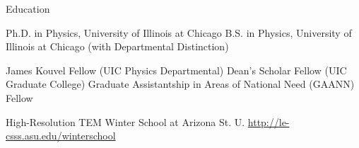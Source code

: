 \begin{rubric}{Education}


  \entry*[2005 --- 2013] Ph.D. in Physics, University of Illinois at Chicago
  \entry*[2002 --- 2005] B.S. in Physics, University of Illinois at Chicago (with Departmental Distinction)
  

  \entry*[2011 --- 2012] James Kouvel Fellow (UIC Physics Departmental)
  \entry*[2011 --- 2012] Dean's Scholar Fellow (UIC Graduate College)
  \entry*[2007 --- 2010] Graduate Assistantship in Areas of National Need (GAANN) Fellow


  \entry*[Jan 2009] High-Resolution TEM Winter School at Arizona St. U. \url{http://le-csss.asu.edu/winterschool}
\end{rubric}
